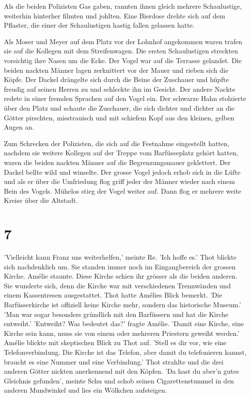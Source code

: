 \documentclass[11pt,titlepage,a5paper]{book}
\begin{document}
Als die beiden Polizisten Gas gaben, rannten ihnen gleich mehrere Schaulustige, weiterhin hinterher filmten und johlten. Eine Bierdose drehte sich auf dem Pflaster, die einer der Schaulustigen hastig fallen gelassen hatte.

Als Moser und Meyer auf dem Platz vor der Lohnhof angekommen waren trafen sie auf die Kollegen mit dem Streifenwagen. Die ersten Schaulustigen streckten vorsichtig ihre Nasen um die Ecke. Der Vogel war auf die Terrasse gelandet. Die beiden nackten Männer lagen zerknittert vor der Mauer und rieben sich die Köpfe. Der Dackel drängelte sich durch die Beine der Zuschauer und hüpfte freudig auf seinen Herren zu und schleckte ihn im Gesicht. Der andere Nackte redete in einer fremden Sprachen auf den Vogel ein. Der schwarze Hahn stolzierte über den Platz und schaute die Zuschauer, die sich dichter und dichter an die Götter pirschten, misstrauisch und mit schiefem Kopf aus den kleinen, gelben Augen an.

Zum Schrecken der Polizisten, die sich auf die Festnahme eingestellt hatten, nachdem sie weitere Kollegen auf der Treppe vom Barfüsseplatz gehört hatten, waren die beiden nackten Männer auf die Begrenzungsmauer geklettert. Der Dackel bellte wild und winselte. Der grosse Vogel jedoch erhob sich in die Lüfte und als er über die Umfriedung flog griff jeder der Männer wieder nach einem Bein des Vogels. Mühelos stieg der Vogel weiter auf. Dann flog er mehrere weite Kreise über die Altstadt. 


\section*{7}

'Vielleicht kann Franz uns weiterhelfen,' meinte Re. 'Ich hoffe es.' Thot blickte sich nachdenklich um. Sie standen immer noch im Eingangbereich der grossen Kirche. Amélie staunte. Diese Kirche schien ihr grösser als die beiden anderen. Sie wunderte sich, denn die Kirche war mit verschiedenen Trennwänden und einem Kassentresen ausgestattet. Thot hatte Amélies Blick bemerkt. 'Die Barfüsserkirche ist offiziell keine Kirche mehr, sondern das historische Museum.' 'Man war sogar besonders gründlich mit den Barfüssern und hat die Kirche entweiht.' 'Entweiht? Was bedeutet das?' fragte Amélie. 'Damit eine Kirche, eine Kirche sein kann, muss sie von einem oder mehreren Priestern geweiht werden.' Amélie blickte mit skeptischen Blick zu Thot auf. 'Stell es dir vor, wie eine Telefonverbindung. Die Kirche ist das Telefon, aber damit du telefonieren kannst, braucht es eine Nummer und eine Verbindung.' Thot strahlte und die drei anderen Götter nickten anerkennend mit den Köpfen. 'Da hast du aber'n gutes Gleichnis gefunden', meinte Schu und schob seinen Cigarettenstummel in den anderen Mundwinkel und lies ein Wölkchen aufsteigen.
\end{document}
